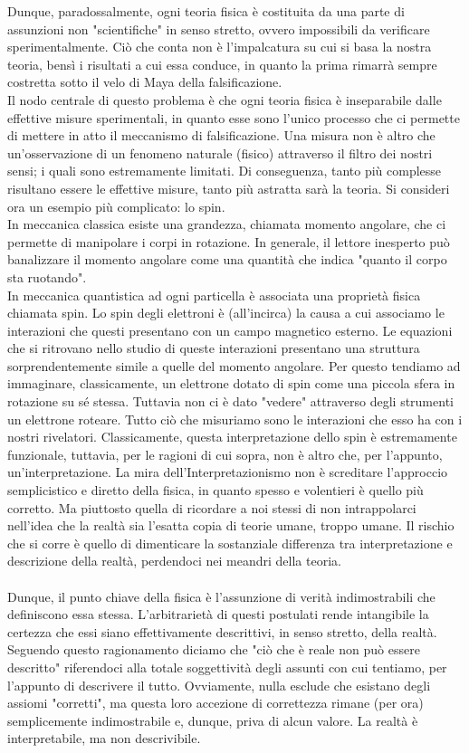 \documentclass[]{article}
\begin{document}
	Dunque, paradossalmente, ogni teoria fisica è costituita da una parte di assunzioni non "scientifiche" in senso stretto, ovvero impossibili da verificare sperimentalmente. Ciò che conta non è l'impalcatura su cui si basa la nostra teoria, bensì i risultati a cui essa conduce, in quanto la prima rimarrà sempre costretta sotto il velo di Maya della falsificazione.\\
	Il nodo centrale di questo problema è che ogni teoria fisica è inseparabile dalle effettive misure sperimentali, in quanto esse sono l'unico processo che ci permette di mettere in atto il meccanismo di falsificazione. Una misura non è altro che un'osservazione di un fenomeno naturale (fisico) attraverso il filtro dei nostri sensi; i quali sono estremamente limitati. Di conseguenza, tanto più complesse risultano essere le effettive misure, tanto più astratta sarà la teoria. Si consideri ora un esempio più complicato: lo spin.\\
	In meccanica classica esiste una grandezza, chiamata momento angolare, che ci permette di manipolare i corpi in rotazione. In generale, il lettore inesperto può banalizzare il momento angolare come una quantità che indica "quanto il corpo sta ruotando".\\
	In meccanica quantistica ad ogni particella è associata una proprietà fisica chiamata spin. Lo spin degli elettroni è (all'incirca) la causa a cui associamo le interazioni che questi presentano con un campo magnetico esterno. Le equazioni che si ritrovano nello studio di queste interazioni presentano una struttura sorprendentemente simile a quelle del momento angolare. Per questo tendiamo ad immaginare, classicamente, un elettrone dotato di spin come una piccola sfera in rotazione su sé stessa. Tuttavia non ci è dato "vedere" attraverso degli strumenti un elettrone roteare. Tutto ciò che misuriamo sono le interazioni che esso ha con i nostri rivelatori. Classicamente, questa interpretazione dello spin è estremamente funzionale, tuttavia, per le ragioni di cui sopra, non è altro che, per l'appunto, un'interpretazione. La mira dell'Interpretazionismo non è screditare l'approccio semplicistico e diretto della fisica, in quanto spesso e volentieri è quello più corretto. Ma piuttosto quella di ricordare a noi stessi di non intrappolarci nell'idea che la realtà sia l'esatta copia di teorie umane, troppo umane.  
	Il rischio che si corre è quello di dimenticare la sostanziale differenza tra interpretazione e descrizione della realtà, perdendoci nei meandri della teoria.\\
	\\
	Dunque, il punto chiave della fisica è l'assunzione di verità indimostrabili che definiscono essa stessa. L'arbitrarietà di questi postulati rende intangibile la certezza che essi siano effettivamente descrittivi, in senso stretto, della realtà. Seguendo questo ragionamento diciamo che "ciò che è reale non può essere descritto" riferendoci alla totale soggettività degli assunti con cui tentiamo, per l'appunto di descrivere il tutto. Ovviamente, nulla esclude che esistano degli assiomi "corretti", ma questa loro accezione di correttezza rimane (per ora) semplicemente indimostrabile e, dunque, priva di alcun valore. La realtà è interpretabile, ma non descrivibile.
	
\end{document}
